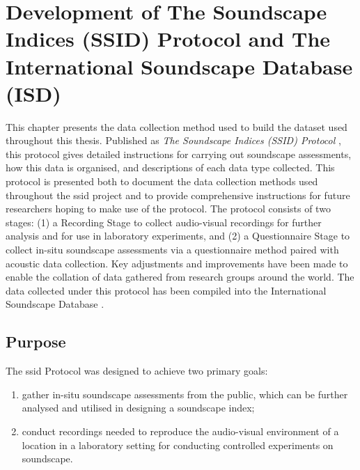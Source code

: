 \chapter[Development of the SSID Protocol]{Development of The Soundscape Indices (SSID) Protocol and The International Soundscape Database (ISD)}

\label{chap:protocol}


This chapter presents the data collection method used to build the dataset used throughout this thesis. Published as \emph{The Soundscape Indices (SSID) Protocol} \citep{Mitchell2020Soundscape}, this protocol gives detailed instructions for carrying out soundscape assessments, how this data is organised, and descriptions of each data type collected. This protocol is presented both to document the data collection methods used throughout the \gls{ssid} project and to provide comprehensive instructions for future researchers hoping to make use of the protocol. The protocol consists of two stages: (1) a Recording Stage to collect audio-visual recordings for further analysis and for use in laboratory experiments, and (2) a Questionnaire Stage to collect in-situ soundscape assessments via a questionnaire method paired with acoustic data collection. Key adjustments and improvements have been made to enable the collation of data gathered from research groups around the world. The data collected under this protocol has been compiled into the International Soundscape Database \citep{Mitchell2021International}. 


\section{Purpose}

 The \gls{ssid} Protocol was designed to achieve two primary goals:
 \begin{enumerate}
   \item gather in-situ soundscape assessments from the public, which can be further analysed and utilised in designing a soundscape index;
   \item conduct recordings needed to reproduce the audio-visual environment of a location in a laboratory setting for conducting controlled experiments on soundscape.
 \end{enumerate}

